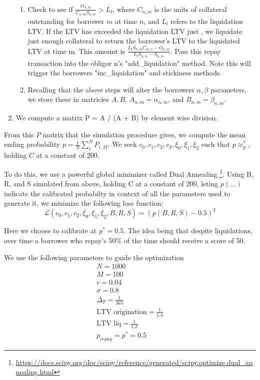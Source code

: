 \documentclass{article}
\begin{document}
\begin{enumerate}
\begin{enumerate}
        \item Check to see if $\frac{O_{n,m}}{C_{n,m}S_{n,m}} > L_l$, where $C_{n,m}$ is the units of collateral outstanding for borrower $m$ at time $n$, and $L_l$ refers to the liquidation LTV. If the LTV has exceeded the liquidation LTV just , we liquidate just enough collateral to return the borrower's LTV to the liquidated LTV at time m. This amount is $\frac{L_lS_{n,m}C_{m,n} - O_{n,m}}{L_lS_{n,m}-S_{n,m}}$. Pass this repay transaction into the obligor n's "add\_liquidation" method. Note this will trigger the borrowers "inc\_liquidation" and stickiness methods.
        \item Recalling that the above steps will alter the borrowers $\alpha, \beta$ parameters, we store these in matricies $A,B$, $A_{n,m} = \alpha_{n,m}$, and $B_{n,m} = \beta_{n,m}$.
    \end{enumerate}
    \item We compute a matrix P = A / (A + B) by element wise division.
\end{enumerate}

From this $P$ matrix that the simulation procedure gives, we compute the mean ending probability $p = \frac{1}{N}\sum_i^NP_{i,M}$. We seek $c_0,c_1,c_2,c_3,\xi_0,\xi_1,\xi_2$ such that $p \approx _p^*$, holding $C$ at a constant of 200.

To do this, we use a powerful global minimizer called Dual Annealing \footnote{\url{https://docs.scipy.org/doc/scipy/reference/generated/scipy.optimize.dual\_annealing.html}}. Using B, R, and S simulated from above, holding C at a constant of 200, leting $p(\dots)$ indicate the calibrated probabilty in context of all the parameters used to generate it, we minimize the following loss function:
\begin{equation*}
    \mathcal{L}(c_0,c_1,c_2,\xi_0,\xi_1,\xi_2, B, R, S) = (p(B, R, S) - 0.5)^2
\end{equation*}

Here we choose to calibrate at $p^* =0.5$. The idea being that despite liquidations, over time a borrower who repay's 50\% of the time should receive a score of 50. 

We use the following parameters to guide the optimization
\begin{align*}
    N = 1000 \\
    M = 100 \\
    r = 0.04 \\
    \sigma = 0.8 \\
    \Delta_T = \frac{1}{365} \\
    \text{LTV origination} = \frac{1}{1.4} \\
    \text{LTV liq} = \frac{1}{1.2} \\
    p_{repay} = p^* = 0.5
\end{align*}
\end{document}
